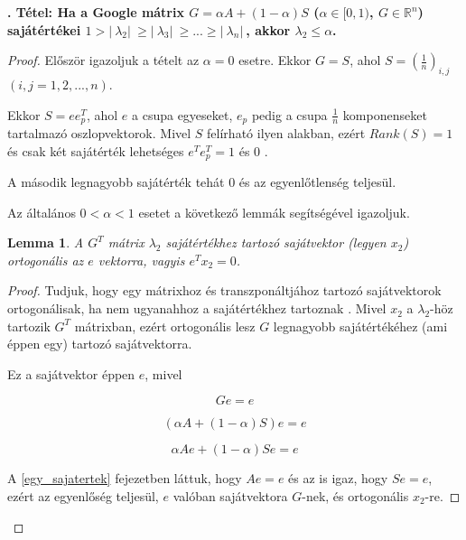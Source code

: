 \documentclass[12pt,a4paper]{article}
\newcounter{tszam}
\newenvironment{tetel}[1]
{{\medskip}\noindent \stepcounter{tszam}
{\bfseries{\thetszam. Tétel: #1\\[1ex]}}}{\bigskip }
\begin{document}
\vspace{0.1cm}
\begin{tetel}{Ha a Google mátrix $G = \alpha A + (1-\alpha)S$ ($\alpha \in [0,1)$, $G \in \mathbb{R}^n$) sajátértékei $ 1 > |\ \lambda_2 |\ \geq |\ \lambda_3 |\ \geq ... \geq |\ \lambda_n |\ $, akkor $\lambda_2 \leq \alpha$. }
\end{tetel}
\vspace{-1cm}
\begin{proof}
	
	Először igazoljuk a tételt az $\alpha = 0$ esetre. Ekkor $G = S$, ahol $S = (\frac{1}{n})_{i,j}$ $(i,j = 1,2,...,n)$.
	
	Ekkor $S = e e_p^T$, ahol $e$ a csupa egyeseket, $e_p$ pedig a csupa $\frac{1}{n}$ komponenseket tartalmazó oszlopvektorok. Mivel $S$ felírható ilyen alakban, ezért $Rank(S) = 1$ és csak két sajátérték lehetséges $e^T e_p^T = 1$ és 0 \cite{rankonematrix}.   
	
	A második legnagyobb sajátérték tehát 0 és az egyenlőtlenség teljesül.
	
	\vspace{0.1cm}
	Az általános $0 < \alpha < 1$ esetet a következő lemmák segítségével igazoljuk. 
	
	\newtheorem{lemma}{Lemma}
	\begin{lemma}
	 	A $G^T$ mátrix $\lambda_2$ sajátértékhez tartozó sajátvektor (legyen $x_2$) ortogonális az $e$ vektorra, vagyis $e^T x_2 = 0$.
	\end{lemma}
	\begin{proof}
		Tudjuk, hogy egy mátrixhoz és transzponáltjához tartozó sajátvektorok ortogonálisak, ha nem ugyanahhoz a sajátértékhez tartoznak \cite{orthogonal_eigenvectors}. Mivel $x_2$ a $\lambda_2$-höz tartozik $G^T$ mátrixban, ezért ortogonális lesz $G$ legnagyobb sajátértékéhez (ami éppen egy) tartozó sajátvektorra. 
		
		Ez a sajátvektor éppen $e$, mivel
		
		\[ G e = e \]
		
		\[  ( \alpha A + (1-\alpha) S ) e = e  \]
		
		\[  \alpha A e + (1-\alpha) S e = e \]
		
		A \ref{egy_sajatertek} fejezetben láttuk, hogy $A e = e$ és az is igaz, hogy $S e = e$, ezért az egyenlőség teljesül, $e$ valóban sajátvektora $G$-nek, és ortogonális $x_2$-re.	
		\phantom\qedhere
	\end{proof}
	
\end{proof}
\end{document}
